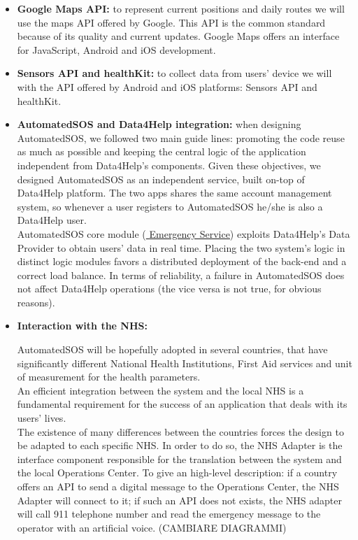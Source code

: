 \begin{itemize}
    \item \textbf{Google Maps API:} to represent current positions and daily routes we will use the maps API offered by Google. This API is the common standard because of its quality and current updates. Google Maps offers an interface for JavaScript, Android and iOS development.
    \item \textbf{Sensors API and healthKit:} to collect data from users' device we will with the API offered by Android and iOS platforms: Sensors API and healthKit.
    \item \textbf{AutomatedSOS and Data4Help integration:} when designing AutomatedSOS, we followed two main guide lines: promoting the code reuse as much as possible and keeping the central logic of the application independent from Data4Help's components.
    Given these objectives, we designed AutomatedSOS as an independent service, built on-top of Data4Help platform. 
    The two apps shares the same account management system, so whenever a user registers to AutomatedSOS he/she is also a Data4Help user.\\
    AutomatedSOS core module (\hyperlink{ES}{ \underline{Emergency Service}}) exploits Data4Help's Data Provider to obtain users' data in real time.
    Placing the two system's logic in distinct logic modules favors a distributed deployment of the back-end and a correct load balance.
    In terms of reliability, a failure in AutomatedSOS does not affect Data4Help operations (the vice versa is not true, for obvious reasons).
    \item \hypertarget{NHS_API}{\textbf{Interaction with the NHS:}} AutomatedSOS will be hopefully adopted in several countries, that have significantly different National Health Institutions, First Aid services and unit of measurement for the health parameters.\\
    An efficient integration between the system and the local NHS is a fundamental requirement for the success of an application that deals with its users' lives.\\
    The existence of many differences between the countries forces the design to be adapted to each specific NHS. In order to do so, the NHS Adapter is the interface component responsible for the translation between the system and the local Operations Center.
    To give an high-level description: if a country offers an API to send a digital message to the Operations Center, the NHS Adapter will connect to it; if such an API does not exists, the NHS adapter will call 911 telephone number and read the emergency message to the operator with an artificial voice.
    (CAMBIARE DIAGRAMMI)
\end{itemize}